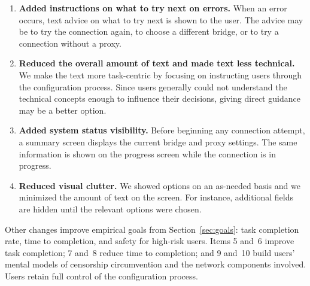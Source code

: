 \documentclass[USenglish,oneside,twocolumn]{article}
\begin{document}
\begin{enumerate}
\item {\bfseries Added instructions on what to try next on errors.} When an error occurs, text advice on what to try next is shown to the user. The advice may be to try the connection again, to choose a different bridge, or to try a connection without a proxy. 
\item {\bfseries Reduced the overall amount of text and made text less technical.} We make the text more task-centric by focusing on instructing users through the configuration process. Since users generally could not understand the technical concepts enough to influence their decisions, giving direct guidance may be a better option. 
\item {\bfseries Added system status visibility.} Before beginning any connection attempt, a summary screen displays the current bridge and proxy settings. The same information is shown on the progress screen while the connection is in progress.
\item {\bfseries Reduced visual clutter.} We showed options on an as-needed basis and we minimized the amount of text on the screen. For instance, additional fields are hidden until the relevant options were chosen.
\end{enumerate} 

Other changes improve empirical goals from Section~\ref{sec:goals}: task completion rate, time to completion, and safety for high-risk users. Items 5 and~6 improve task completion; 7 and~8 reduce time to completion; and 9 and~10 build users' mental models of censorship circumvention and the network components involved. Users retain full control of the configuration process.\\ 
\end{document}

